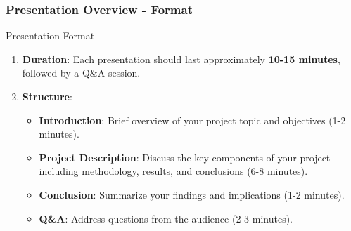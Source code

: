\documentclass[aspectratio=169]{beamer}
\begin{document}
\begin{frame}[fragile]
    \frametitle{Presentation Overview - Format}
    \begin{block}{Presentation Format}
        \begin{enumerate}
            \item \textbf{Duration}: Each presentation should last approximately \textbf{10-15 minutes}, followed by a Q\&A session.
            \item \textbf{Structure}:
            \begin{itemize}
                \item \textbf{Introduction}: Brief overview of your project topic and objectives (1-2 minutes).
                \item \textbf{Project Description}: Discuss the key components of your project including methodology, results, and conclusions (6-8 minutes).
                \item \textbf{Conclusion}: Summarize your findings and implications (1-2 minutes).
                \item \textbf{Q\&A}: Address questions from the audience (2-3 minutes).
            \end{itemize}
        \end{enumerate}
    \end{block}
\end{frame}
\end{document}
